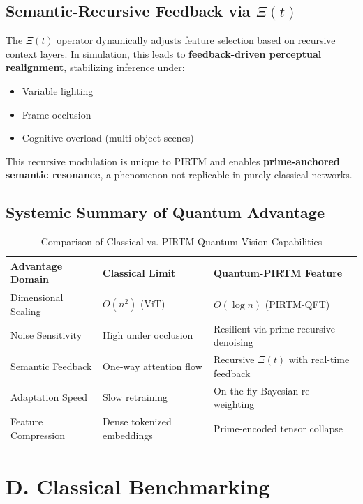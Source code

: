 \documentclass[12pt]{article}
\theoremstyle{plain}
\begin{document}
\subsection*{Semantic-Recursive Feedback via $\Xi(t)$}

The $\Xi(t)$ operator dynamically adjusts feature selection based on recursive context layers. In simulation, this leads to \textbf{feedback-driven perceptual realignment}, stabilizing inference under:
\begin{itemize}
    \item Variable lighting
    \item Frame occlusion
    \item Cognitive overload (multi-object scenes)
\end{itemize}

This recursive modulation is unique to PIRTM and enables \textbf{prime-anchored semantic resonance}, a phenomenon not replicable in purely classical networks.

\subsection*{Systemic Summary of Quantum Advantage}

\begin{table}[h!]
\centering
\begin{tabular}{|l|l|l|}
\hline
\textbf{Advantage Domain} & \textbf{Classical Limit} & \textbf{Quantum-PIRTM Feature} \\
\hline
Dimensional Scaling & $O(n^2)$ (ViT) & $O(\log n)$ (PIRTM-QFT) \\
\hline
Noise Sensitivity & High under occlusion & Resilient via prime recursive denoising \\
\hline
Semantic Feedback & One-way attention flow & Recursive $\Xi(t)$ with real-time feedback \\
\hline
Adaptation Speed & Slow retraining & On-the-fly Bayesian re-weighting \\
\hline
Feature Compression & Dense tokenized embeddings & Prime-encoded tensor collapse \\
\hline
\end{tabular}
\caption{Comparison of Classical vs. PIRTM-Quantum Vision Capabilities}
\end{table}

\section*{D. Classical Benchmarking}
\end{document}

